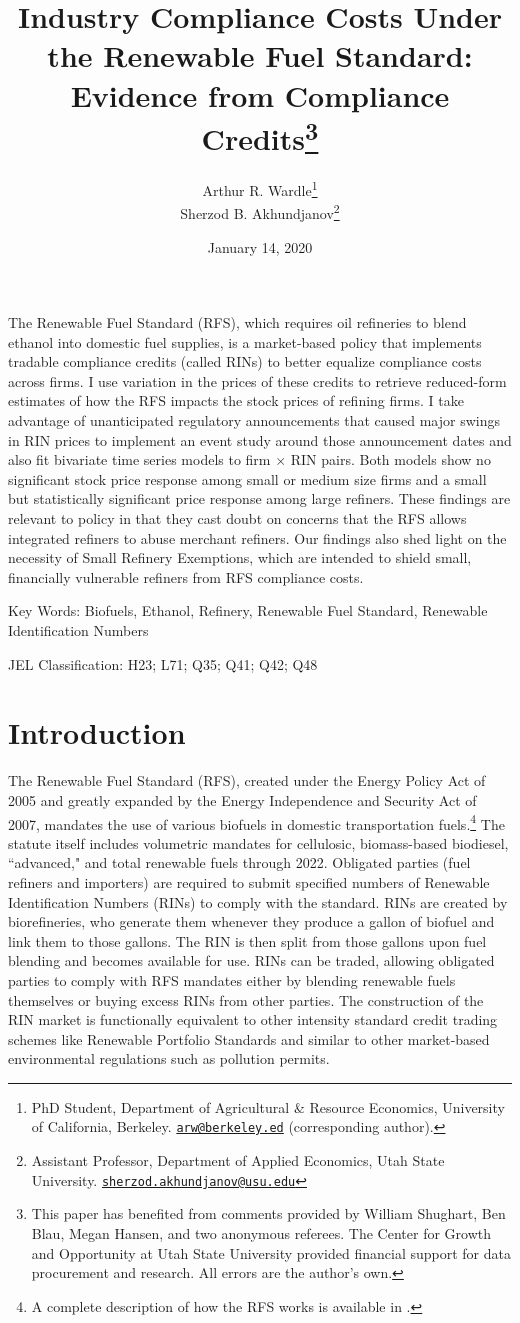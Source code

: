 \documentclass[11pt]{article}
\title{{\Large \bf Industry Compliance Costs Under the Renewable Fuel Standard: Evidence from Compliance Credits\thanks{This paper has benefited from comments provided by William Shughart, Ben Blau, Megan Hansen, and two anonymous referees. The Center for Growth and Opportunity at Utah State University provided financial support for data procurement and research. All errors are the author's own.}}}
\author{Arthur R. Wardle\footnote{
PhD Student, Department of Agricultural \& Resource Economics, University of California, Berkeley. \href{mailto:arw@berkeley.edu}{\tt arw@berkeley.ed} (corresponding author).}\\
Sherzod B. Akhundjanov\footnote{Assistant Professor, Department of Applied Economics, Utah State University. \href{matilto:sherzod.akhundjanov@usu.edu}{\tt sherzod.akhundjanov@usu.edu}}}
\date{January 14, 2020}
\begin{document}
\maketitle

The Renewable Fuel Standard (RFS), which requires oil refineries to blend ethanol into domestic fuel supplies, is a market-based policy that implements tradable compliance credits (called RINs) to better equalize compliance costs across firms. I use variation in the prices of these credits to retrieve reduced-form estimates of how the RFS impacts the stock prices of refining firms. I take advantage of unanticipated regulatory announcements that caused major swings in RIN prices to implement an event study around those announcement dates and also fit bivariate time series models to firm $\times$ RIN pairs. Both models show no significant stock price response among small or medium size firms and a small but statistically significant price response among large refiners. These findings are relevant to policy in that they cast doubt on concerns that the RFS allows integrated refiners to abuse merchant refiners. Our findings also shed light on the necessity of Small Refinery Exemptions, which are intended to shield small, financially vulnerable refiners from RFS compliance costs.
\newline

{\small
Key Words: Biofuels, Ethanol, Refinery, Renewable Fuel Standard, Renewable Identification Numbers

JEL Classification: H23; L71; Q35; Q41; Q42; Q48}
\newpage

\section{Introduction}

The Renewable Fuel Standard (RFS), created under the Energy Policy Act of 2005 and greatly expanded by the Energy Independence and Security Act of 2007, mandates the use of various biofuels in domestic transportation fuels.\footnote{A complete description of how the RFS works is available in \cite{Schnepf2013}.} The statute itself includes volumetric mandates for cellulosic, biomass-based biodiesel, ``advanced," and total renewable fuels through 2022. Obligated parties (fuel refiners and importers) are required to submit specified numbers of Renewable Identification Numbers (RINs) to comply with the standard. RINs are created by biorefineries, who generate them whenever they produce a gallon of biofuel and link them to those gallons. The RIN is then split from those gallons upon fuel blending and becomes available for use. RINs can be traded, allowing obligated parties to comply with RFS mandates either by blending renewable fuels themselves or buying excess RINs from other parties. The construction of the RIN market is functionally equivalent to other intensity standard credit trading schemes like Renewable Portfolio Standards and similar to other market-based environmental regulations such as pollution permits. 
\end{document}
